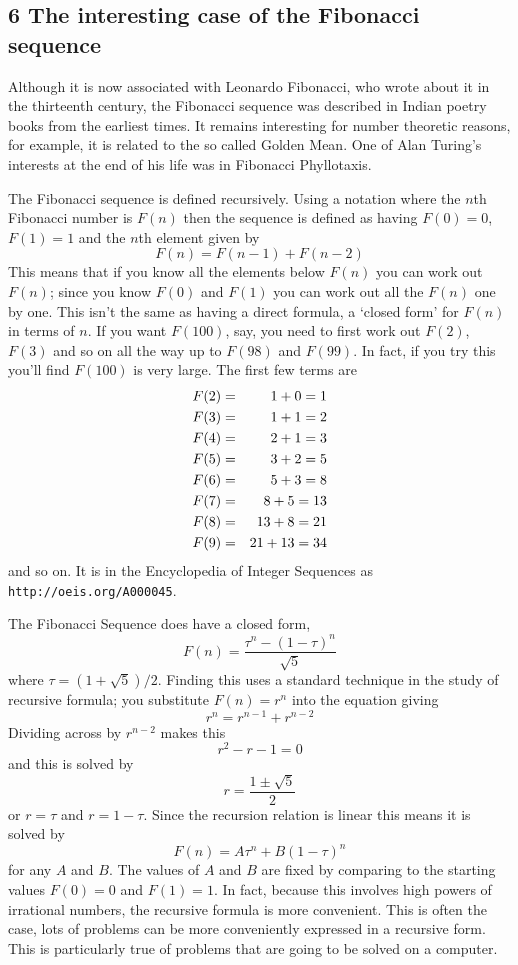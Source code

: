 \documentclass[11pt,a4paper]{scrartcl}
\begin{document}
\subsection*{6 The interesting case of the Fibonacci sequence}

Although it is now associated with Leonardo Fibonacci, who wrote about
it in the thirteenth century, the Fibonacci sequence was described in
Indian poetry books from the earliest times. It remains interesting
for number theoretic reasons, for example, it is related to the so
called Golden Mean. One of Alan Turing's interests at the end of his
life was in Fibonacci Phyllotaxis.

The Fibonacci sequence is defined recursively. Using a notation where
the $n$th Fibonacci number is $F(n)$ then the sequence is defined as
having $F(0)=0$, $F(1)=1$ and the $n$th element given by
\begin{equation}
F(n)=F(n-1)+F(n-2)
\end{equation}
This means that if you know all the elements below $F(n)$ you can work
out $F(n)$; since you know $F(0)$ and $F(1)$ you can work out all the
$F(n)$ one by one. This isn't the same as having a direct formula, a
\lq{}closed form\rq{} for $F(n)$ in terms of $n$. If you want
$F(100)$, say, you need to first work out $F(2)$, $F(3)$ and so on all
the way up to $F(98)$ and $F(99)$. In fact, if you try this you'll
find $F(100)$ is very large. The first few terms are
\begin{eqnarray}
F(2)&=&1+0=1\cr
F(3)&=&1+1=2\cr
F(4)&=&2+1=3\cr
F(5)&=&3+2=5\cr
F(6)&=&5+3=8\cr
F(7)&=&8+5=13\cr
F(8)&=&13+8=21\cr
F(9)&=&21+13=34
\end{eqnarray}
and so on. It is in the Encyclopedia of Integer Sequences as {\tt
  http://oeis.org/A000045}. 

The Fibonacci Sequence does have a closed form,
\begin{equation}
F(n)=\frac{\tau^n-(1-\tau)^n}{\sqrt{5}}
\end{equation}
where $\tau=(1+\sqrt{5})/2$. Finding this uses a standard technique in
the study of recursive formula; you substitute $F(n)=r^n$ into the
equation giving
\begin{equation}
r^n=r^{n-1}+r^{n-2}
\end{equation}
Dividing across by $r^{n-2}$ makes this
\begin{equation}
r^2-r-1=0
\end{equation}
and this is solved by
\begin{equation}
r=\frac{1\pm\sqrt{5}}{2}
\end{equation}
or $r=\tau$ and $r=1-\tau$. Since the recursion relation is linear
this means it is solved by
\begin{equation}
F(n)=A \tau^n + B (1-\tau)^n
\end{equation}
for any $A$ and $B$. The values of $A$ and $B$ are fixed by comparing
to the starting values $F(0)=0$ and $F(1)=1$. In fact, because this
involves high powers of irrational numbers, the recursive formula is
more convenient. This is often the case, lots of problems can be more
conveniently expressed in a recursive form. This is particularly true
of problems that are going to be solved on a computer.
\end{document}
